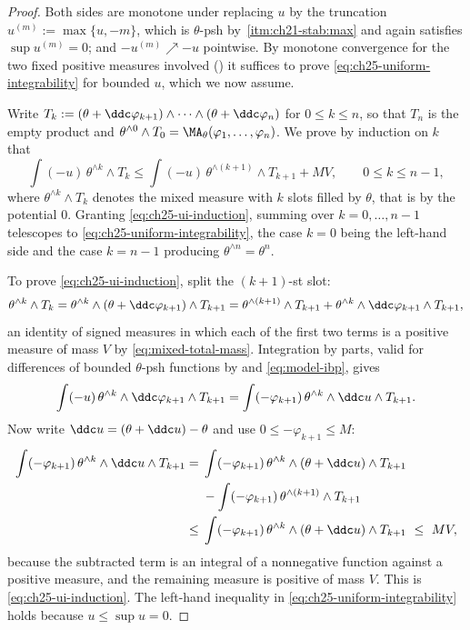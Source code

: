 \begin{proof}
Both sides are monotone under replacing \(u\) by the truncation
\(u^{(m)}:=\max\{u,-m\}\), which is \(\theta\)-psh by
\,\cref{itm:ch21-stab:max} and again satisfies
\(\sup u^{(m)}=0\); and \(-u^{(m)}\nearrow-u\) pointwise.  By monotone
convergence for the two fixed positive measures involved
() it suffices to prove
\eqref{eq:ch25-uniform-integrability} for bounded \(u\), which we now assume.

Write \(T_k:=(\theta+\ddc\varphi_{k+1})\wedge\cdots\wedge
(\theta+\ddc\varphi_n)\) for \(0\leq k\leq n\), so that \(T_n\) is the empty
product and \(\theta^{\wedge0}\wedge T_0=\MA_\theta(\varphi_1,\ldots,
\varphi_n)\).  We prove by induction on \(k\) that
\begin{equation}
\label{eq:ch25-ui-induction}
 \int(-u)\,\theta^{\wedge k}\wedge T_k
 \leq\int(-u)\,\theta^{\wedge(k+1)}\wedge T_{k+1}+MV ,
 \qquad 0\leq k\leq n-1 ,
\end{equation}
where \(\theta^{\wedge k}\wedge T_k\) denotes the mixed measure with \(k\)
slots filled by \(\theta\), that is by the potential \(0\).  Granting
\eqref{eq:ch25-ui-induction}, summing over \(k=0,\ldots,n-1\) telescopes to
\eqref{eq:ch25-uniform-integrability}, the case \(k=0\) being the left-hand
side and the case \(k=n-1\) producing \(\theta^{\wedge n}=\theta^n\).

To prove \eqref{eq:ch25-ui-induction}, split the \((k+1)\)-st slot:
\[
 \theta^{\wedge k}\wedge T_k
 =\theta^{\wedge k}\wedge(\theta+\ddc\varphi_{k+1})\wedge T_{k+1}
 =\theta^{\wedge(k+1)}\wedge T_{k+1}
  +\theta^{\wedge k}\wedge\ddc\varphi_{k+1}\wedge T_{k+1},
\]
an identity of signed measures in which each of the first two terms is a
positive measure of mass \(V\) by \eqref{eq:mixed-total-mass}.  Integration
by parts, valid for differences of bounded \(\theta\)-psh functions by
 and \eqref{eq:model-ibp}, gives
\[
 \int(-u)\,\theta^{\wedge k}\wedge\ddc\varphi_{k+1}\wedge T_{k+1}
 =\int(-\varphi_{k+1})\,\theta^{\wedge k}\wedge\ddc u\wedge T_{k+1}.
\]
Now write \(\ddc u=(\theta+\ddc u)-\theta\) and use
\(0\leq-\varphi_{k+1}\leq M\):
\[
\begin{split}
 \int(-\varphi_{k+1})\,\theta^{\wedge k}\wedge\ddc u\wedge T_{k+1}
 ={}&\int(-\varphi_{k+1})\,
     \theta^{\wedge k}\wedge(\theta+\ddc u)\wedge T_{k+1}\\
    &-\int(-\varphi_{k+1})\,\theta^{\wedge(k+1)}\wedge T_{k+1}\\
 \leq{}&\int(-\varphi_{k+1})\,
     \theta^{\wedge k}\wedge(\theta+\ddc u)\wedge T_{k+1}
 \ \leq\ MV,
\end{split}
\]
because the subtracted term is an integral of a nonnegative function against
a positive measure, and the remaining measure is positive of mass \(V\).
This is \eqref{eq:ch25-ui-induction}.  The left-hand inequality in
\eqref{eq:ch25-uniform-integrability} holds because \(u\leq\sup u=0\).
\end{proof}


